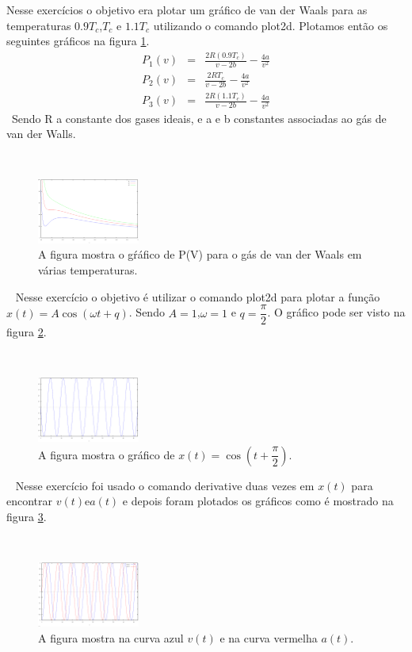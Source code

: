 \documentclass[a4wide]{report}
\begin{document}
 Nesse exercícios o objetivo era plotar um gráfico de van der Waals para as temperaturas $0.9T_{c}$,$T_{c}$ e $1.1T_{c}$ utilizando o comando plot2d. Plotamos então os seguintes gráficos na figura \ref{02}.\\
\begin{eqnarray}
P_{1}(v) &=& \frac{2R(0.9T_{c})}{v-2b}-\frac{4a}{v^{2}}\\
P_{2}(v) &=& \frac{2RT_{c}}{v-2b}-\frac{4a}{v^{2}}\\
P_{3}(v) &=& \frac{2R(1.1T_{c})}{v-2b}-\frac{4a}{v^{2}}
\end{eqnarray}
\
Sendo R a constante dos gases ideais, e a e b constantes associadas ao gás de van der Walls.


\
\begin{figure}[h]
\centering
\includegraphics[width=0.30\textwidth]{02.pdf}
\caption{A figura mostra o gŕáfico de P(V) para o gás de van der Waals em várias temperaturas.}
\label{02}
\end{figure}
\
 Nesse exercício o objetivo é utilizar o comando plot2d para plotar a função $x(t)=A\cos(\omega t+q)$. Sendo $A=1$,$\omega=1$ e $q=\dfrac{\pi}{2}$. O gráfico pode ser visto na figura \ref{03}.

\
\begin{figure}[h]
\centering
\includegraphics[width=0.30\textwidth]{03a.pdf}
\caption{A figura mostra o gráfico de $x(t)=\cos(t+\dfrac{\pi}{2})$.}
\label{03}
\end{figure}
\
\noindent{\bf Questão 3-b)} Nesse exercício foi usado o comando derivative duas vezes em $x(t)$ para encontrar $v(t)$e$a(t)$ e depois foram plotados os gráficos como é mostrado na figura \ref{03b}.

\
\begin{figure}[h]
\centering
\includegraphics[width=0.30\textwidth]{03b.pdf}
\caption{A figura mostra na curva azul $v(t)$ e na curva vermelha $a(t)$.}
\label{03b}
\end{figure}
\
\end{document}
